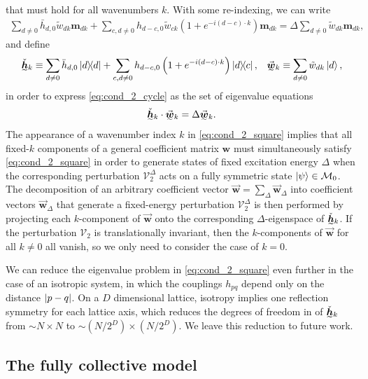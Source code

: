\documentclass[nofootinbib,notitlepage,11pt]{revtex4-2}
\newcommand{\p}[1]{\left(#1\right)} %
\renewcommand{\c}{\cdot} %
\newcommand{\m}{\bm} %
\renewcommand{\v}{\vec} %
\newcommand{\1}{\mathds{1}}
\newcommand{\M}{\mathcal{M}}
\newcommand{\V}{\mathcal{V}}
\newcommand{\ut}{\undertilde}
\begin{document}
that must hold for all wavenumbers $k$.  With some re-indexing, we can
write
\begin{align}
  \sum_{d\ne0} \bar h_{d,0} \tilde w_{dk} \m m_{dk}
  + \sum_{c,d\ne0} h_{d-c,0} \tilde w_{ck}
  \p{1 + e^{-i\p{d-c}\c k}} \m m_{dk}
  = \Delta \sum_{d\ne0} \tilde w_{dk} \m m_{dk},
  \label{eq:cond_2_cycle}
\end{align}
and define
\begin{align}
  \ut{\check{\m h}}_k
  \equiv \sum_{d\ne0} \bar h_{d,0} \op{d}
  + \sum_{c,d\ne0} h_{d-c,0} \p{1+e^{-i\p{d-c}\c k}} \op{d}{c},
  &&
  \ut{\v{\m w}}_k \equiv \sum_{d\ne0} \tilde w_{dk} \ket{d},
  \label{eq:cycle_vecs}
\end{align}
in order to express \eqref{eq:cond_2_cycle} as the set of eigenvalue
equations
\begin{align}
  \ut{\check{\m h}}_k \c \ut{\v{\m w}}_k = \Delta \ut{\v{\m w}}_k.
  \label{eq:cond_2_square}
\end{align}
The appearance of a wavenumber index $k$ in \eqref{eq:cond_2_square}
implies that all fixed-$k$ components of a general coefficient matrix
$\m w$ must simultaneously satisfy \eqref{eq:cond_2_square} in order
to generate states of fixed excitation energy $\Delta$ when the
corresponding perturbation $\V_2^\Delta$ acts on a fully symmetric
state $\ket\psi\in\M_0$.  The decomposition of an arbitrary
coefficient vector $\v{\m w}=\sum_\Delta\v{\m w}_\Delta$ into
coefficient vectors $\v{\m w}_\Delta$ that generate a fixed-energy
perturbation $\V_2^\Delta$ is then performed by projecting each
$k$-component of $\v{\m w}$ onto the corresponding $\Delta$-eigenspace
of $\ut{\check{\m h}}_k$.  If the perturbation $\V_2$ is
translationally invariant, then the $k$-components of $\v{\m w}$ for
all $k\ne 0$ all vanish, so we only need to consider the case of
$k=0$.

We can reduce the eigenvalue problem in \eqref{eq:cond_2_square} even
further in the case of an isotropic system, in which the couplings
$h_{pq}$ depend only on the distance $\abs{p-q}$.  On a $D$
dimensional lattice, isotropy implies one reflection symmetry for each
lattice axis, which reduces the degrees of freedom in of
$\ut{\check{\m h}}_k$ from $\sim N\times N$ to
$\sim\p{N/2^D}\times\p{N/2^D}$.  We leave this reduction to future
work.

\subsection{The fully collective model}
\end{document}
